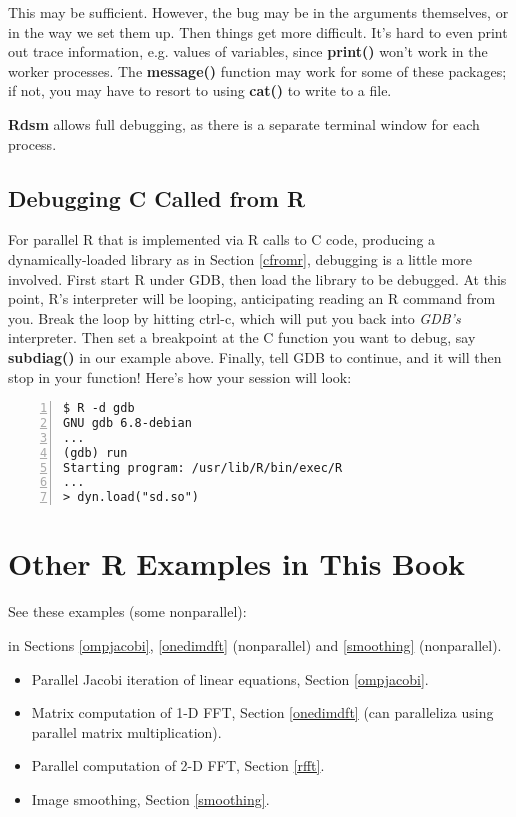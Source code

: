 This may be sufficient.  However, the bug may be in the arguments
themselves, or in the way we set them up.  Then things get more
difficult.  It's hard to even print out trace information, e.g. values
of variables, since {\bf print()} won't work in the worker processes.
The {\bf message()} function may work for some of these packages; if
not, you may have to resort to using {\bf cat()} to write to a file.  

{\bf Rdsm} allows full debugging, as there is a separate terminal window
for each process.

\subsection{Debugging C Called from R}

For parallel R that is implemented via R calls to C code, producing a
dynamically-loaded library as in Section \ref{cfromr}, debugging is a
little more involved.  First start R under GDB, then load the library to
be debugged.  At this point, R's interpreter will be looping,
anticipating reading an R command from you.  Break the loop by hitting
ctrl-c, which will put you back into {\it GDB's} interpreter.  Then set
a breakpoint at the C function you want to debug, say {\bf subdiag()} in
our example above.  Finally, tell GDB to continue, and it will then stop
in your function!  Here's how your session will look:

\begin{lstlisting}[numbers=left]
$ R -d gdb
GNU gdb 6.8-debian
...
(gdb) run
Starting program: /usr/lib/R/bin/exec/R
...
> dyn.load("sd.so")
\end{lstlisting}

\section{Other R Examples in This Book}

See these examples (some nonparallel):

in Sections \ref{ompjacobi}, \ref{onedimdft} (nonparallel)
and \ref{smoothing} (nonparallel).

\begin{itemize}

\item Parallel Jacobi iteration of linear equations, Section \ref{ompjacobi}.

\item Matrix computation of 1-D FFT, Section \ref{onedimdft} (can
paralleliza using parallel matrix multiplication). 

\item Parallel computation of 2-D FFT, Section \ref{rfft}.

\item Image smoothing, Section \ref{smoothing}.

\end{itemize}



